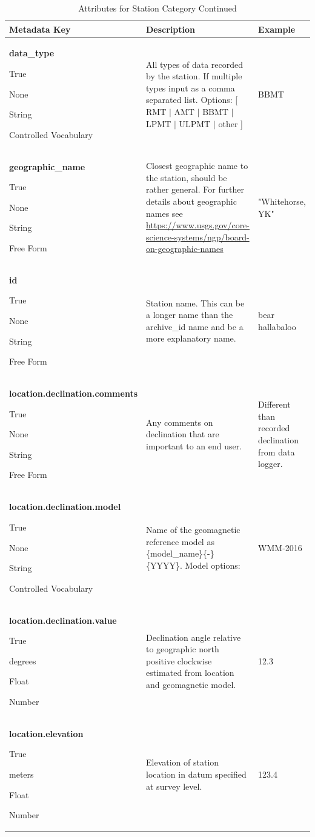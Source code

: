 \documentclass[12pt]{article}
\newcommand{\entry}[7]{
	\textbf{#1} 
	\begin{itemize}[topsep=5pt,itemsep=-.1pt,parsep=-2pt,partopsep=0pt,labelwidth=2em,align=left,itemindent=1em]
		\begin{small}
			\item[Required:] #2
			\item[Units:] #3
			\item[Type:] #4
			\item[Style:] #5
		\end{small}
	\end{itemize} & #6 & #7 \\ \midrule}
\begin{document}
\clearpage
\newpage
\begin{table}[h!]
	\caption*{Attributes for Station Category Continued}
	\begin{tabular}{p{}>{\raggedright}p{}p{}}
		\textbf{Metadata Key} & \textbf{Description} & \textbf{Example} \\ \toprule
		\entry{data\_type}{True}{None}{String}{Controlled Vocabulary}{All types of data recorded by the station. If multiple types input as a comma separated list. \qquad Options: [ RMT $|$ AMT $|$ BBMT $|$ LPMT $|$ ULPMT $|$ other ]}{BBMT}
		\entry{geographic\_name}{True}{None}{String}{Free Form}{Closest geographic name to the station, should be rather general.  For further details about geographic names see \url{https://www.usgs.gov/core-science-systems/ngp/board-on-geographic-names}}{"Whitehorse, YK"}
		\entry{id}{True}{None}{String}{Free Form}{Station name.  This can be a longer name than the archive\_id name and be a more explanatory name.}{bear hallabaloo}
		\entry{location.declination.comments}{True}{None}{String}{Free Form}{Any comments on declination that are important to an end user.}{Different than recorded declination from data logger.}
		\entry{location.declination.model}{True}{None}{String}{Controlled Vocabulary}{Name of the geomagnetic reference model as \{model\_name\}\{-\}\{YYYY\}. Model options: \qquad [ EMAG2 $|$ EMM $|$ HDGM $|$ IGRF $|$ WMM ]}{WMM-2016}
		\entry{location.declination.value}{True}{degrees}{Float}{Number}{Declination angle relative to geographic north positive clockwise estimated from location and geomagnetic model.}{12.3}
		\entry{location.elevation}{True}{meters}{Float}{Number}{Elevation of station location in datum specified at survey level.}{123.4}
	\end{tabular}
\end{table}
\end{document}
